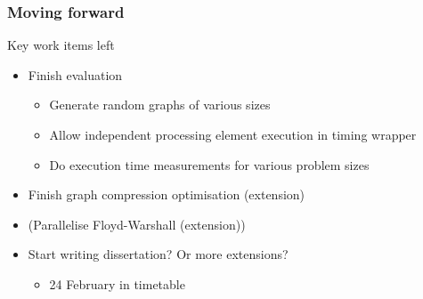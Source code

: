 \documentclass{beamer}
\begin{document}
%
% 
%
\begin{frame}[t]
    \frametitle{Moving forward}
    \begin{block}{Key work items left}
    \begin{itemize}
        \item Finish evaluation
            \begin{itemize}
                \item Generate random graphs of various sizes
                \item Allow independent processing element execution in timing wrapper %
                \item Do execution time measurements for various problem sizes
            \end{itemize}
        \item Finish graph compression optimisation (extension)
        \item (Parallelise Floyd-Warshall (extension))
        \item Start writing dissertation? Or more extensions?
            \begin{itemize}
                \item 24 February in timetable
            \end{itemize}
    \end{itemize}
    \end{block}
\end{frame}
\end{document}
